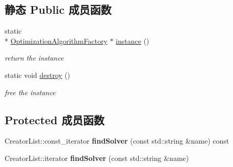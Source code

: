 \subsection*{静态 Public 成员函数}
\begin{DoxyCompactItemize}
\item 
\hypertarget{classg2o_1_1OptimizationAlgorithmFactory_a4fe827a82f01c74ef124e7a9a9c98707}{static \\*
\hyperlink{classg2o_1_1OptimizationAlgorithmFactory}{Optimization\-Algorithm\-Factory} $\ast$ \hyperlink{classg2o_1_1OptimizationAlgorithmFactory_a4fe827a82f01c74ef124e7a9a9c98707}{instance} ()}\label{classg2o_1_1OptimizationAlgorithmFactory_a4fe827a82f01c74ef124e7a9a9c98707}

\begin{DoxyCompactList}\small\item\em return the instance \end{DoxyCompactList}\item 
\hypertarget{classg2o_1_1OptimizationAlgorithmFactory_a80b6a74ac262e6192064ec264f965bd7}{static void \hyperlink{classg2o_1_1OptimizationAlgorithmFactory_a80b6a74ac262e6192064ec264f965bd7}{destroy} ()}\label{classg2o_1_1OptimizationAlgorithmFactory_a80b6a74ac262e6192064ec264f965bd7}

\begin{DoxyCompactList}\small\item\em free the instance \end{DoxyCompactList}\end{DoxyCompactItemize}
\subsection*{Protected 成员函数}
\begin{DoxyCompactItemize}
\item 
\hypertarget{classg2o_1_1OptimizationAlgorithmFactory_a8e37aaa37f66f7f5e3bdd8a3c8bf58c6}{Creator\-List\-::const\-\_\-iterator {\bfseries find\-Solver} (const std\-::string \&name) const }\label{classg2o_1_1OptimizationAlgorithmFactory_a8e37aaa37f66f7f5e3bdd8a3c8bf58c6}

\item 
\hypertarget{classg2o_1_1OptimizationAlgorithmFactory_a75857fd4977318d51412f4ebae20157d}{Creator\-List\-::iterator {\bfseries find\-Solver} (const std\-::string \&name)}\label{classg2o_1_1OptimizationAlgorithmFactory_a75857fd4977318d51412f4ebae20157d}

\end{DoxyCompactItemize}
